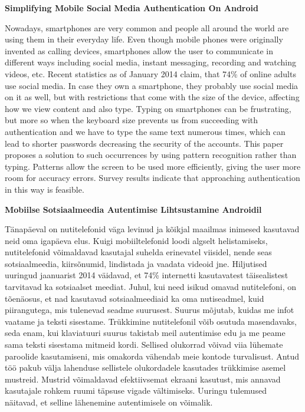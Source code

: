 \noindent\textbf{\large Simplifying Mobile Social Media Authentication On Android}
\vspace*{2ex}
{}

\noindent Nowadays, smartphones are very common and people all around the world are using them in their everyday life. Even though mobile phones were originally invented as calling devices, smartphones allow the user to communicate in different ways including social media, instant messaging, recording and watching videos, etc. Recent statistics as of January 2014 claim, that 74\% of online adults use social media. In case they own a smartphone, they probably use social media on it as well, but with restrictions that come with the size of the device, affecting how we view content and also type. Typing on smartphones can be frustrating, but more so when the keyboard size prevents us from succeeding with authentication and we have to type the same text numerous times, which can lead to shorter passwords decreasing the security of the accounts. This paper proposes a solution to such occurrences by using pattern recognition rather than typing. Patterns allow the screen to be used more efficiently, giving the user more room for accuracy errors. Survey results indicate that approaching authentication in this way is feasible.

\vspace*{2ex}

{}

\vspace*{3ex}

\noindent\textbf{\large Mobiilse Sotsiaalmeedia Autentimise Lihtsustamine Androidil}
\vspace*{2ex}
{}

\noindent T\"{a}nap\"{a}eval on nutitelefonid v\"{a}ga levinud ja k\~{o}ikjal maailmas inimesed kasutavad neid oma igap\"{a}eva elus. Kuigi mobiiltelefonid loodi algselt helistamiseks, nutitelefonid v\~{o}imaldavad kasutajal suhelda erinevatel viisidel, nende seas sotsiaalmeedia, kiirs\~{o}numid, lindistada ja vaadata videoid jne. Hiljutised uuringud jaanuarist 2014 v\"{a}idavad, et 74\% internetti kasutavatest t\"{a}isealistest tarvitavad ka sotsiaalset meediat. Juhul, kui need isikud omavad nutitelefoni, on t\~{o}en\"{a}osus, et nad kasutavad sotsiaalmeediaid ka oma nutiseadmel, kuid piirangutega, mis tulenevad seadme suurusest. Suurus m\~{o}jutab, kuidas me infot vaatame ja teksti sisestame. Tr\"{u}kkimine nutitelefonil v\~{o}ib osutuda masendavaks, seda enam, kui klaviatuuri suurus takistab meil autentimise edu ja me peame sama teksti sisestama mitmeid kordi. Sellised olukorrad v\~{o}ivad viia l\"{u}hemate paroolide kasutamiseni, mis omakorda v\"{a}hendab meie kontode turvalisust. Antud t\"{o}\"{o} pakub v\"{a}lja lahenduse sellistele olukordadele kasutades tr\"{u}kkimise asemel mustreid. Mustrid v\~{o}imaldavad efektiivsemat ekraani kasutust, mis annavad kasutajale rohkem ruumi t\"{a}psuse vigade v\"{a}ltimiseks. Uuringu tulemused n\"{a}itavad, et selline l\"{a}henemine autentimisele on v\~{o}imalik.

\vspace*{2ex}

{}